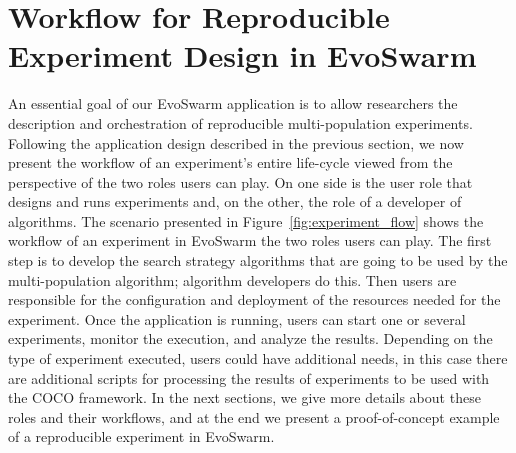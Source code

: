 \documentclass[review]{elsarticle}
\begin{document}
\section{Workflow for Reproducible Experiment Design in EvoSwarm} 
\label{experiment_flow}

An essential goal of our EvoSwarm application is to allow researchers the
description and orchestration of reproducible multi-population experiments.
Following the application design described in the previous section, we now
present the workflow of an experiment's entire life-cycle viewed from the
perspective of the two roles users can play. On one side is the user role that
designs and runs experiments and, on the other, the role of a developer of
algorithms. The scenario presented in Figure~\ref{fig:experiment_flow} shows the
workflow of an experiment in Evo\-Swarm the two roles users can play. The first
step is to develop the search strategy algorithms that are going to be used by
the multi-population algorithm; algorithm developers do this. Then users are
responsible for the configuration and deployment of the resources needed for the
experiment. Once the application is running, users can start one or several
experiments, monitor the execution, and analyze the results. Depending on the
type of experiment executed, users could have additional needs, in this case
there are additional scripts for processing the results of experiments to be
used with the COCO framework. In the next sections, we give more details about
these roles and their workflows, and at the end we present a proof-of-concept example of a
reproducible experiment in EvoSwarm.



  
\end{document}
